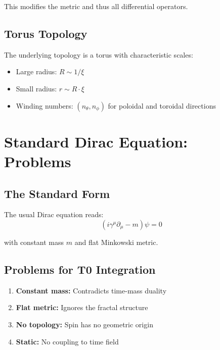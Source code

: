 	This modifies the metric and thus all differential operators.
	
	\subsection{Torus Topology}
	
	The underlying topology is a torus with characteristic scales:
	\begin{itemize}
		\item Large radius: $R \sim 1/\xi$
		\item Small radius: $r \sim R \cdot \xi$
		\item Winding numbers: $(n_\theta, n_\phi)$ for poloidal and toroidal directions
	\end{itemize}
	
	\section{Standard Dirac Equation: Problems}
	
	\subsection{The Standard Form}
	
	The usual Dirac equation reads:
	\begin{equation}
		(i\gamma^\mu \partial_\mu - m)\psi = 0
		\label{eq:standard_dirac}
	\end{equation}
	
	with constant mass $m$ and flat Minkowski metric.
	
	\subsection{Problems for T0 Integration}
	
	\begin{enumerate}
		\item \textbf{Constant mass:} Contradicts time-mass duality
		\item \textbf{Flat metric:} Ignores the fractal structure
		\item \textbf{No topology:} Spin has no geometric origin
		\item \textbf{Static:} No coupling to time field
	\end{enumerate}

